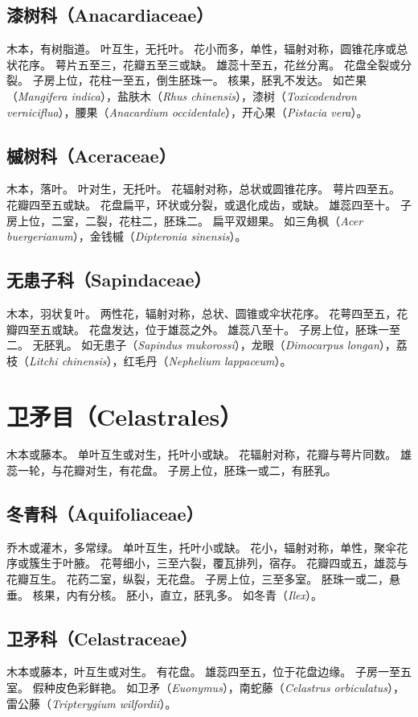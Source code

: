\documentclass[11pt]{article}
\begin{document}
\begin{sloppypar}
\subsection{漆树科（Anacardiaceae）}
木本，有树脂道。
叶互生，无托叶。
花小而多，单性，辐射对称，圆锥花序或总状花序。
萼片五至三，花瓣五至三或缺。
雄蕊十至五，花丝分离。
花盘全裂或分裂。
子房上位，花柱一至五，倒生胚珠一。
核果，胚乳不发达。
如芒果（\textit{Mangifera indica}），盐肤木（\textit{Rhus chinensis}），漆树（\textit{Toxicodendron verniciflua}），腰果（\textit{Anacardium occidentale}），开心果（\textit{Pistacia vera}）。

\subsection{槭树科（Aceraceae）}
木本，落叶。
叶对生，无托叶。
花辐射对称，总状或圆锥花序。
萼片四至五。
花瓣四至五或缺。
花盘扁平，环状或分裂，或退化成齿，或缺。
雄蕊四至十。
子房上位，二室，二裂，花柱二，胚珠二。
扁平双翅果。
如三角枫（\textit{Acer buergerianum}），金钱槭（\textit{Dipteronia sinensis}）。

\subsection{无患子科（Sapindaceae）}
木本，羽状复叶。
两性花，辐射对称，总状、圆锥或伞状花序。
花萼四至五，花瓣四至五或缺。
花盘发达，位于雄蕊之外。
雄蕊八至十。
子房上位，胚珠一至二。
无胚乳。
如无患子（\textit{Sapindus mukorossi}），龙眼（\textit{Dimocarpus longan}），荔枝（\textit{Litchi chinensis}），红毛丹（\textit{Nephelium lappaceum}）。

\section{卫矛目（Celastrales）}
木本或藤本。
单叶互生或对生，托叶小或缺。
花辐射对称，花瓣与萼片同数。
雄蕊一轮，与花瓣对生，有花盘。
子房上位，胚珠一或二，有胚乳。

\subsection{冬青科（Aquifoliaceae）}
乔木或灌木，多常绿。
单叶互生，托叶小或缺。
花小，辐射对称，单性，聚伞花序或簇生于叶腋。
花萼细小，三至六裂，覆瓦排列，宿存。
花瓣四或五，雄蕊与花瓣互生。
花药二室，纵裂，无花盘。
子房上位，三至多室。
胚珠一或二，悬垂。
核果，内有分核。
胚小，直立，胚乳多。
如冬青（\textit{Ilex}）。

\subsection{卫矛科（Celastraceae）}
木本或藤本，叶互生或对生。
有花盘。
雄蕊四至五，位于花盘边缘。
子房一至五室。
假种皮色彩鲜艳。
如卫矛（\textit{Euonymus}），南蛇藤（\textit{Celastrus orbiculatus}），雷公藤（\textit{Tripterygium wilfordii}）。


\end{sloppypar}
\end{document}
